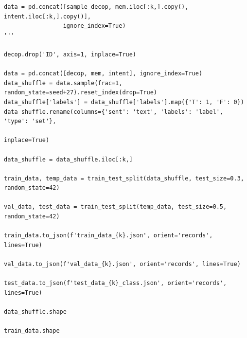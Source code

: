 \documentclass[10pt,twocolumn,letterpaper]{article}
\begin{document}
\begin{verbatim}
data = pd.concat([sample_decop, mem.iloc[:k,].copy(), intent.iloc[:k,].copy()],
                 ignore_index=True)
'''

decop.drop('ID', axis=1, inplace=True)

data = pd.concat([decop, mem, intent], ignore_index=True)
data_shuffle = data.sample(frac=1, random_state=seed+27).reset_index(drop=True)
data_shuffle['labels'] = data_shuffle['labels'].map({'T': 1, 'F': 0})
data_shuffle.rename(columns={'sent': 'text', 'labels': 'label', 'type': 'set'}, 
                                                                        inplace=True)

data_shuffle = data_shuffle.iloc[:k,]

train_data, temp_data = train_test_split(data_shuffle, test_size=0.3, random_state=42)

val_data, test_data = train_test_split(temp_data, test_size=0.5, random_state=42)

train_data.to_json(f'train_data_{k}.json', orient='records', lines=True)

val_data.to_json(f'val_data_{k}.json', orient='records', lines=True)

test_data.to_json(f'test_data_{k}_class.json', orient='records', lines=True)

data_shuffle.shape

train_data.shape
\end{verbatim}
\end{document}

